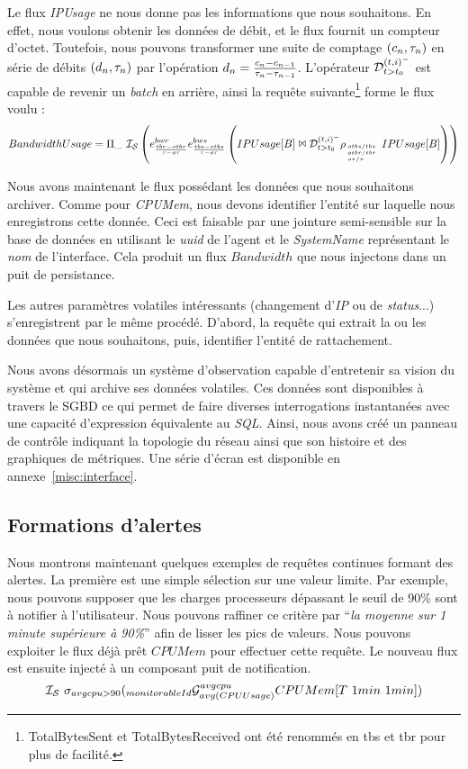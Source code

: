 Le flux \textit{IPUsage} ne nous donne pas les informations que nous souhaitons. En effet, nous voulons obtenir les données de débit, et le flux fournit un compteur d'octet. Toutefois, nous pouvons transformer une suite de comptage $(c_n,\tau_n)$ en série de débits $(d_n,\tau_n)$ par l'opération $d_n=\frac{c_n-c_{n-1}}{\tau_n-\tau_{n-1}}$. L'opérateur $\mathcal{D}_{t>t_0}^{(t,i)^-}$ est capable de revenir un \textit{batch} en arrière, ainsi la requête suivante\footnote{TotalBytesSent et TotalBytesReceived ont été renommés en tbs et tbr pour plus de facilité.} forme le flux voulu :
$$BandwidthUsage = \Pi_{...}\ \mathcal{I_S} \left( e_{\frac{tbr-otbr}{\tau-o\tau}}^{bwr} e_{\frac{tbs-otbs}{\tau-o\tau}}^{bws}\left(IPUsage[B] \Join \mathcal{D}_{t>t_0}^{(t,i)^-} \rho_{\hspace{-0.33em}\mbox{\tiny $\begin{array}{l} otbs/tbs\\otbr/tbr\\ o\tau/\tau\end{array}$}}IPUsage[B]\right)\right)$$

Nous avons maintenant le flux possédant les données que nous souhaitons archiver. Comme pour \textit{CPUMem}, nous devons identifier l'entité sur laquelle nous enregistrons cette donnée. Ceci est faisable par une jointure semi-sensible sur la base de données en utilisant le \textit{uuid} de l'agent et le \textit{SystemName} représentant le \textit{nom} de l'interface. Cela produit un flux $Bandwidth$ que nous injectons dans un puit de persistance.

Les autres paramètres volatiles intéressants (changement d'\textit{IP} ou de \textit{status}...) s'enregistrent par le même procédé. D'abord, la requête qui extrait la ou les données que nous souhaitons, puis, identifier l'entité de rattachement.

Nous avons désormais un système d'observation capable d'entretenir sa vision du système et qui archive ses données volatiles. Ces données sont disponibles à travers le SGBD ce qui permet de faire diverses interrogations instantanées avec une capacité d'expression équivalente au \textit{SQL}. Ainsi, nous avons créé un panneau de contrôle indiquant la topologie du réseau ainsi que son histoire et des graphiques de métriques. Une série d'écran est disponible en annexe~\ref{misc:interface}.

\subsection{Formations d'alertes}
Nous montrons maintenant quelques exemples de requêtes continues formant des alertes. La première est une simple sélection sur une valeur limite. Par exemple, nous pouvons supposer que les charges processeurs dépassant le seuil de 90\% sont à notifier à l'utilisateur. Nous pouvons raffiner ce critère par \enquote{\it la moyenne sur 1 minute supérieure à 90\%} afin de lisser les pics de valeurs. Nous pouvons exploiter le flux déjà prêt $CPUMem$ pour effectuer cette requête. Le nouveau flux est ensuite injecté à un composant puit de notification.
$$\IS\ \sigma_{avgcpu>90}(\null_{monitorableId}\G_{avg(CPUUsage)}^{avgcpu} CPUMem[T\ 1min\ 1min])$$

